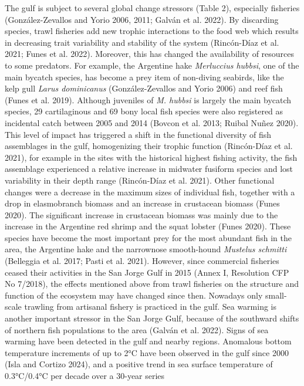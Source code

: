 \documentclass[
]{article}
\begin{document}
The gulf is subject to several global change stressors (Table 2),
especially fisheries (González-Zevallos and Yorio 2006, 2011; Galván et
al. 2022). By discarding species, trawl fisheries add new trophic
interactions to the food web which results in decreasing trait
variability and stability of the system (Rincón-Díaz et al. 2021; Funes
et al. 2022). Moreover, this has changed the availability of resources
to some predators. For example, the Argentine hake \emph{Merluccius
hubbsi}, one of the main bycatch species, has become a prey item of
non-diving seabirds, like the kelp gull \emph{Larus dominicanus}
(González-Zevallos and Yorio 2006) and reef fish (Funes et al. 2019).
Although juveniles of \emph{M. hubbsi} is largely the main bycatch
species, 29 cartilaginous and 69 bony local fish species were also
registered as incidental catch between 2005 and 2014 (Bovcon et al.
2013; Ruibal Nuñez 2020). This level of impact has triggered a shift in
the functional diversity of fish assemblages in the gulf, homogenizing
their trophic function (Rincón-Díaz et al. 2021), for example in the
sites with the historical highest fishing activity, the fish assemblage
experienced a relative increase in midwater fusiform species and lost
variability in their depth range (Rincón-Díaz et al. 2021). Other
functional changes were a decrease in the maximum sizes of individual
fish, together with a drop in elasmobranch biomass and an increase in
crustacean biomass (Funes 2020). The significant increase in crustacean
biomass was mainly due to the increase in the Argentine red shrimp and
the squat lobster (Funes 2020). These species have become the most
important prey for the most abundant fish in the area, the Argentine
hake and the narrownose smooth-hound \emph{Mustelus schmitti} (Belleggia
et al. 2017; Pasti et al. 2021). However, since commercial fisheries
ceased their activities in the San Jorge Gulf in 2015 (Annex I,
Resolution CFP No 7/2018), the effects mentioned above from trawl
fisheries on the structure and function of the ecosystem may have
changed since then. Nowadays only small-scale trawling from artisanal
fishery is practiced in the gulf. Sea warming is another important
stressor in the San Jorge Gulf, because of the southward shifts of
northern fish populations to the area (Galván et al. 2022). Signs of sea
warming have been detected in the gulf and nearby regions. Anomalous
bottom temperature increments of up to 2°C have been observed in the
gulf since 2000 (Isla and Cortizo 2024), and a positive trend in sea
surface temperature of 0.3°C/0.4°C per decade over a 30-year series
\end{document}
